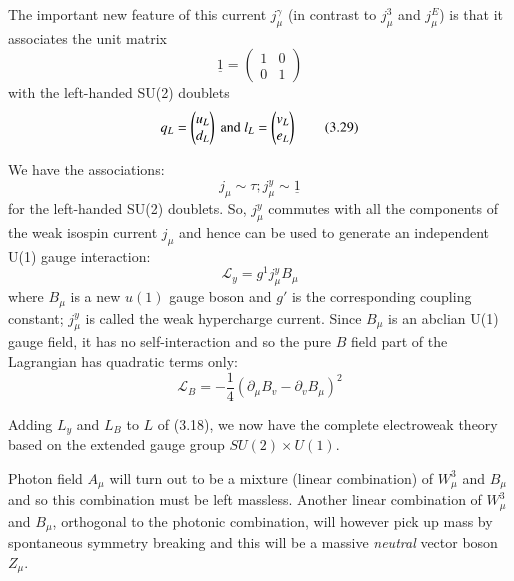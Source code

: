 The important new feature of this current $j^{\gamma}_{\mu}$ (in contrast to $j^{3}_{\mu}$ and $j^{E}_{\mu}$) is that it associates the unit matrix 
\begin{equation*}
\underline{1}= 
\begin{pmatrix}
1 & 0\\
0 & 1
\end{pmatrix}\tag{3.28}
\end{equation*}
with the left-handed SU(2) doublets 
\begin{equation*}
q_{L}= 
\begin{pmatrix}
u_{L}\\
d_{L}
\end{pmatrix}~{\rm and}~
l_{L} =
\begin{pmatrix}
v_{L}\\
e_{L}
\end{pmatrix}\tag{3.29}
\end{equation*}

We have the associations: 
\begin{equation*}
j_{\mu} \sim \tau ; j^{y}_{\mu} \sim \underline{1}\tag{3.30}
\end{equation*}
for the left-handed SU(2) doublets. So, $j^{y}_{\mu}$ commutes with all the components of the weak isospin current $j_{\mu}$ and hence can be used to generate an independent U(1) gauge interaction: 
\begin{equation*}
\mathcal{L}_{y} = g^{1}j^{y}_{\mu}B_{\mu}\tag{3.31}
\end{equation*}
where $B_{\mu}$ is a new $u(1)$ gauge boson and $g'$ is the corresponding coupling constant; $j^{y}_{\mu}$ is called the weak hypercharge current. Since $B_{\mu}$ is an abclian U(1) gauge field, it has no self-interaction and so the pure $B$ field part of the Lagrangian has quadratic terms only: 
\begin{equation*}
\mathcal{L}_{B}= - \frac{1}{4} (\partial_{\mu} B_{v}- \partial_{v}B_{\mu})^{2}\tag{3.32}
\end{equation*}

Adding $L_{y}$ and $L_{B}$ to $L$ of (3.18), we now have the complete electroweak theory based on the extended gauge group $SU(2) \times U(1)$.

Photon field $A_{\mu}$ will turn out to be a mixture (linear combination) of $W^{3}_{\mu}$ and $B_{\mu}$ and so this combination must be left massless. Another linear combination of $W^{3}_{\mu}$ and $B_{\mu}$, orthogonal to the photonic combination, will however pick up mass by spontaneous symmetry breaking and this will be a massive {\it neutral} vector boson $Z_{\mu}$.  

